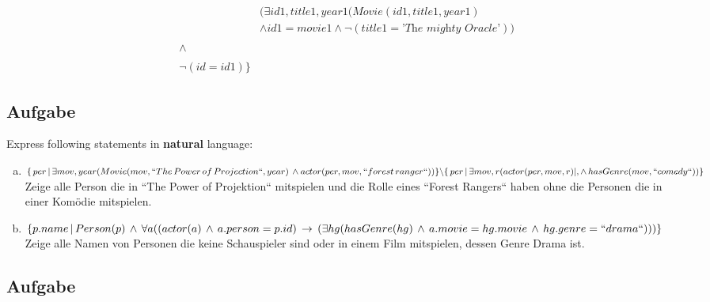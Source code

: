 \documentclass[11pt,a4paper,DIV=9]{scrartcl}
\newcounter{temp}
\newcommand{\aufgabe}[1]{
  \setcounter{temp}{\value{subsection}}
  \setcounter{subsection}{#1}
  \addtocounter{subsection}{-1}
  \subsection{Aufgabe}
  \setcounter{subsection}{\value{temp}}
}
\begin{document}
\begin{enumerate}[a)]
\begin{description}
\begin{align*}
                      & (\exists id1, title1, year1 (Movie(id1, title1, year1)\\
                      & \wedge id1 = movie1 \wedge \neg(title1=\textit{'The mighty Oracle'}))\\
                      &\\
                      \wedge\,\,\,\,\, &\\
                      &\\
                      \neg(id = id1)
                      \}
                      \end{align*}
        \end{description}
    \end{enumerate}
\aufgabe{2}
Express following statements in \textbf{natural} language:
 \begin{enumerate}[a)]
   \item 
   $ 
   \{\, per \, | \, \exists mov, year (\\ 
   Movie(mov, ``The \, Power \, of \, Projection``, year) \,  \wedge \, \\actor(per,mov, ``forest \, ranger``)\\ 
   ) \} \backslash \{ \,per \, | \, \exists mov, r(actor(per, mov, r) |, \wedge \, hasGenre(mov, ``comedy``))\}
   $
  \\ Zeige alle Person die in ``The Power of Projektion`` mitspielen und die Rolle eines ``Forest Rangers`` haben ohne die Personen die in einer Kom\"odie mitspielen.
   \item 
   $
   \{p.name \, | \, Person(p) \, \wedge \, \forall a(\\  
   (actor(a) \, \wedge \, a.person=p.id) \, \rightarrow \, (\\
   \exists hg(hasGenre(hg) \, \wedge \, a.movie=hg.movie \, \wedge \, hg.genre=``drama``)
   \\)\\)\}
   $
   \\ Zeige alle Namen von Personen die keine Schauspieler sind oder in einem Film mitspielen, dessen Genre Drama ist.
 \end{enumerate}
\aufgabe{3}
\end{document}
